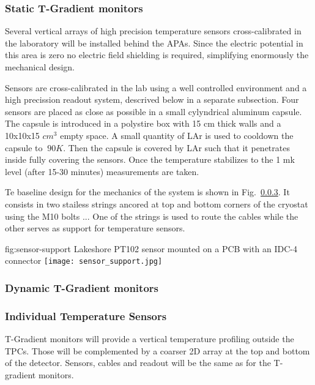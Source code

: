 \subsubsection{Static T-Gradient monitors}

Several vertical arrays of high precision temperature sensors cross-calibrated in the laboratory will be installed behind the APAs.
Since the electric potential in this area is zero no electric field shielding is required, simplifying enormously the mechanical design.

Sensors are cross-calibrated in the lab using a well controlled environment and a high precission readout system, descrived below in a separate subsection.  
Four sensors are placed as close as possible in a small cylyndrical aluminum capsule. The capsule is introduced in a polystire box with 15 cm thick walls
and a 10x10x15 $cm^3$ empty space. A small quantity of LAr is used to cooldown the capsule to $~90 K$. Then the capsule is covered by LAr such that it penetrates
inside fully covering the sensors. Once the temperature stabilizes to the 1 mk level (after 15-30 minutes) measurements are taken. 

Te baseline design for the mechanics of the system is shown in Fig.~\ref{}. It consists in two stailess strings ancored at top and bottom corners of the cryostat
using the M10 bolts ... One of the strings is used to route the cables while the other serves as support for temperature sensors. 


\begin{dunefigure}{fig:sensor-support}
  {Lakeshore PT102 sensor mounted on a PCB with an IDC-4 connector}
  \texttt{[image: sensor\_support.jpg]}%
\end{dunefigure}

\subsubsection{Dynamic T-Gradient monitors}

\subsubsection{Individual Temperature Sensors}

T-Gradient monitors will provide a vertical temperature profiling outside the TPCs. Those will be complemented by a coarser 2D array at the top and bottom of the
detector. Sensors, cables and readout will be the same as for the T-gradient monitors. 

